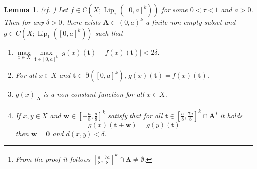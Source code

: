 \documentclass[11pt]{article}
\theoremstyle{plain}
\newtheorem{lem}[thm]{Lemma}
\theoremstyle{definition}
\DeclareMathOperator{\Lip}{Lip}
\DeclareMathOperator{\Edge}{\partial}
\def\tt{\mathbf t}
\def\AA{\mathbf A}
\numberwithin{figure}{section}
\begin{document}
\begin{lem}\label{main lemma}(cf. \cite[Lemmas 2.1 \& 2.5]{GJT19})
    Let $f\in C(X;\Lip_{\tau}([0,a]^k))$ for some $0<\tau<1$ and $a>0$. 
      Then for any $\delta>0$, there exists $\AA \subset (0,a)^k$ a finite non-empty subset and $g\in C(X;\Lip_{1}([0,a]^k))$ such that
   \begin{enumerate}[$(1)$]
   \item  $\max\limits_{x\in X}\max\limits_{\mathbf t\in[0,a]^k}|g(x)(\tt)-f(x)(\tt)|<2\delta$.
   \item For all $x\in X$ and $\tt\in\Edge([0,a]^k)$,  $g(x)(\tt)=f(x)(\tt)$.
     \item $g(x)_{|\AA}$ is a non-constant function for all $x\in X$.
        \item If $x,y\in X$ and $\mathbf w\in[-\frac{a}{8},\frac{a}{8}]^k$ satisfy that for all $\tt \in\left[\frac{a}{8},\frac{7a}{8}\right]^k\cap \AA$\footnote{From the proof it follows $\left[\frac{a}{8},\frac{7a}{8}\right]^k\cap \AA\neq\emptyset$.}  it holds 
   \begin{equation*}
       g(x)(\mathbf{t+w})=g(y)(\tt)
   \end{equation*}
   then $\mathbf w=\mathbf{0}$ and $d(x,y)<\delta$.
   \end{enumerate}
\end{lem}
\end{document}
